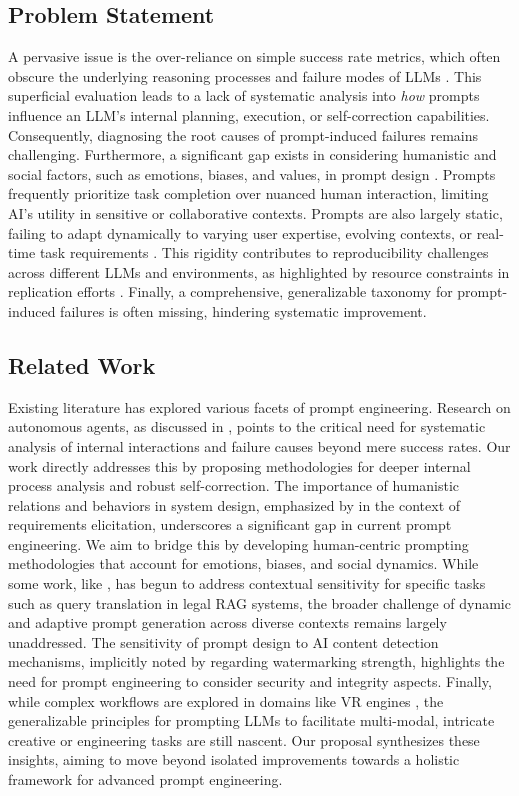 \documentclass{article}
\begin{document}
\subsection{Problem Statement}
A pervasive issue is the over-reliance on simple success rate metrics, which often obscure the underlying reasoning processes and failure modes of LLMs \cite{PaperOne}. This superficial evaluation leads to a lack of systematic analysis into \textit{how} prompts influence an LLM's internal planning, execution, or self-correction capabilities. Consequently, diagnosing the root causes of prompt-induced failures remains challenging. Furthermore, a significant gap exists in considering humanistic and social factors, such as emotions, biases, and values, in prompt design \cite{PaperTwo}. Prompts frequently prioritize task completion over nuanced human interaction, limiting AI's utility in sensitive or collaborative contexts. Prompts are also largely static, failing to adapt dynamically to varying user expertise, evolving contexts, or real-time task requirements \cite{PaperFive}. This rigidity contributes to reproducibility challenges across different LLMs and environments, as highlighted by resource constraints in replication efforts \cite{PaperFive}. Finally, a comprehensive, generalizable taxonomy for prompt-induced failures is often missing, hindering systematic improvement.

\subsection{Related Work}
Existing literature has explored various facets of prompt engineering. Research on autonomous agents, as discussed in \cite{PaperOne}, points to the critical need for systematic analysis of internal interactions and failure causes beyond mere success rates. Our work directly addresses this by proposing methodologies for deeper internal process analysis and robust self-correction. The importance of humanistic relations and behaviors in system design, emphasized by \cite{PaperTwo} in the context of requirements elicitation, underscores a significant gap in current prompt engineering. We aim to bridge this by developing human-centric prompting methodologies that account for emotions, biases, and social dynamics. While some work, like \cite{PaperFive}, has begun to address contextual sensitivity for specific tasks such as query translation in legal RAG systems, the broader challenge of dynamic and adaptive prompt generation across diverse contexts remains largely unaddressed. The sensitivity of prompt design to AI content detection mechanisms, implicitly noted by \cite{PaperThree} regarding watermarking strength, highlights the need for prompt engineering to consider security and integrity aspects. Finally, while complex workflows are explored in domains like VR engines \cite{PaperFour}, the generalizable principles for prompting LLMs to facilitate multi-modal, intricate creative or engineering tasks are still nascent. Our proposal synthesizes these insights, aiming to move beyond isolated improvements towards a holistic framework for advanced prompt engineering.
\end{document}
